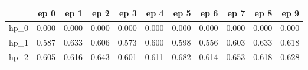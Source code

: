 \begin{tabular}{lrrrrrrrrrr}
\toprule
{} &   ep 0 &   ep 1 &   ep 2 &   ep 3 &   ep 4 &   ep 5 &   ep 6 &   ep 7 &   ep 8 &   ep 9 \\
\midrule
hp\_0 &  0.000 &  0.000 &  0.000 &  0.000 &  0.000 &  0.000 &  0.000 &  0.000 &  0.000 &  0.000 \\
hp\_1 &  0.587 &  0.633 &  0.606 &  0.573 &  0.600 &  0.598 &  0.556 &  0.603 &  0.633 &  0.618 \\
hp\_2 &  0.605 &  0.616 &  0.643 &  0.601 &  0.611 &  0.682 &  0.614 &  0.653 &  0.618 &  0.628 \\
\bottomrule
\end{tabular}
